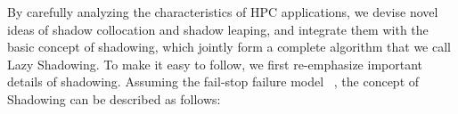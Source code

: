 By carefully analyzing the characteristics of HPC applications, we devise novel ideas 
of shadow collocation and shadow leaping, and integrate them with the basic concept of shadowing, which jointly form a complete algorithm that we call Lazy Shadowing. 
To make it easy to follow, we first re-emphasize important details of shadowing. %
Assuming the fail-stop failure model%
~\cite{gartner_faults_1999,cristian_comm_1991}, 
the concept of Shadowing can be described as follows:
